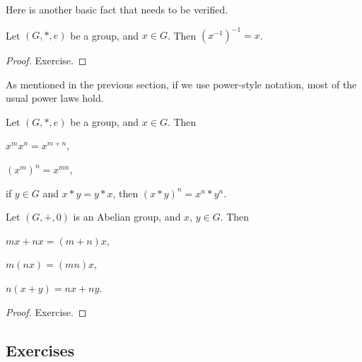 Here is another basic fact that needs to be verified.

\begin{proposition}
  Let $(G, \ast, e)$ be a group, and $x \in G$.  Then $(x^{-1})^{-1} = x$.
\end{proposition}
\begin{proof}
  Exercise.
\end{proof}

As mentioned in the previous section, if we use power-style notation, most of
the usual power laws hold.

\begin{proposition}
  Let $(G, \ast, e)$ be a group, and $x \in G$.  Then
  \begin{theoremenum}
    \item $x^{m}x^{n} = x^{m+n}$,
    \item $(x^{m})^{n} = x^{mn}$,
    \item if $y \in G$ and $x \ast y = y \ast x$, then $(x \ast y)^{n} = 
    x^{n} \ast y^{n}$.
  \end{theoremenum}
    
  Let $(G, +, 0)$ is an Abelian group, and $x$, $y \in G$.  Then
  \begin{theoremenum}
    \item $mx + nx = (m+n)x$,
    \item $m(nx) = (mn)x$,
    \item $n(x+y) = nx + ny$.
  \end{theoremenum}
\end{proposition}
\begin{proof}
  Exercise.
\end{proof}

\subsection*{Exercises}

